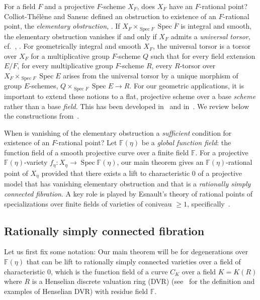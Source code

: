 \documentclass[11pt]{article}
\theoremstyle{definition}
\numberwithin{equation}{section}
\numberwithin{figure}{section}
\numberwithin{table}{section}
\newcommand{\mbb}{\mathbb}
\newcommand{\FF}{\mbb{F}}
\newcommand{\ol}{\overline}
\newcommand{\Xx}{X}
\newcommand{\Rr}{R}
\DeclareMathOperator{\SP}{Spec}
\begin{document}
For a field $F$ and a projective $F$-scheme $\Xx_F$, does $\Xx_F$ have an $F$-rational point? Colliot-Thélène and Sansuc defined an obstruction to existence of an $F$-rational point, the
\emph{elementary obstruction}, \cite[Section~2.2]{CTSansuc}. If $\Xx_F\times_{\SP F} \SP \ol{F}$ is integral and smooth, the elementary obstruction vanishes if and only if $\Xx_F$ admits a \emph{universal torsor}, cf.~\cite[Proposition~2.2.3]{CTSansuc}, \cite[Theorem~2.3.4]{Sk}. For geometrically integral and smooth $\Xx_F$, the universal torsor is a torsor over $\Xx_F$ for a multiplicative group $F$-scheme $Q$ such that for every field extension $E/F$, for every multiplicative group $F$-scheme $R$, every $R$-torsor over $\Xx_F\times_{\SP F} \SP E$ arises from the universal torsor by a unique morphism of group $E$-schemes, $Q\times_{\SP F} \SP E \to R$. For our geometric applications, it is important to extend these notions to a flat, projective scheme over a base \emph{scheme} rather than a base \emph{field}. This has been developed in~\cite[Definition, p.~468]{Pirutka} and in~\cite{Zhu}. We review below the constructions from~\cite{Zhu}.

When is vanishing of the elementary obstruction a \emph{sufficient} condition for existence of an $F$-rational point? Let $\FF(\eta)$ be a \emph{global function field}: the function field of a smooth projective curve over a finite field $\FF$. For a projective $\FF(\eta)$-variety $f_\eta:\Xx_\eta \to \SP \FF(\eta)$, our main theorem gives an $\FF(\eta)$-rational point of $\Xx_\eta$ provided that there exists a lift to characteristic $0$ of a projective model that has vanishing elementary obstruction and that is a \emph{rationally simply connected fibration}. A key role is played by Esnault's theory of rational points of specializations over finite fields of varieties of coniveau $\geq 1$, specifically~\cite[Corollary~1.2]{Esnaultpadic}.


\subsection{Rationally simply connected fibration}

Let us first fix some notation: Our main theorem will be for degenerations over $\mathbb{F}(\eta)$ that can be lift to rationally simply connected varieties over a field of characteristic 0, which is the function field of a curve $C_K$ over a field $K=K(\Rr)$ where $\Rr$ is a Henselian discrete valuation ring (DVR) (see~\cite{Greenberg84} for the definition and examples of Henselian DVR) with residue field $\FF$.
\end{document}
